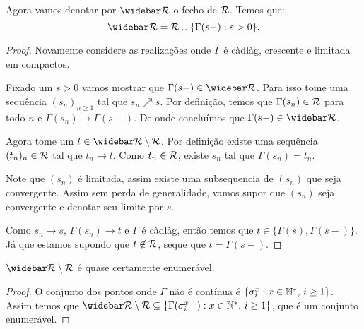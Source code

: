 \begin{proposicao}
  Agora vamos denotar por $\RRb$ o fecho de ${\mathcal{R}}$. Temos que:
  \begin{displaymath}
    \RRb = \RR \cup \{ \Gamma(s-) : s > 0 \}.
  \end{displaymath}
\end{proposicao}
\begin{proof}
  Novamente considere as realizações onde $\Gamma$ é càdlàg, crescente
  e limitada em compactos.

  Fixado um $s > 0$ vamos mostrar que $\Gamma(s-) \in \RRb$. Para isso
  tome uma sequência $(s_n)_{n \geq 1}$ tal que $s_n \nearrow s$. Por
  definição, temos que $\Gamma(s_n) \in {\mathcal{R}}$ para todo $n$ e
  $\Gamma(s_n) \to \Gamma(s-)$. De onde concluímos que $\Gamma(s-) \in
  \RRb$.

  Agora tome um $t \in \RRb \setminus \RR$. Por definição existe uma
  sequência $(t_n)_n \in {\mathcal{R}}$ tal que $t_n \to t$. Como $t_n \in {\mathcal{R}}$,
  existe $s_n$ tal que $\Gamma(s_n) = t_n$.

  Note que $(s_n)$ é limitada, assim existe uma subsequencia de $(s_n)$
  que seja convergente. Assim sem perda de generalidade, vamos supor
  que $(s_n)$ seja convergente e denotar seu limite por $s$.

  Como $s_n \to s$, $\Gamma(s_n) \to t$ e $\Gamma$ é càdlàg, então
  temos que $t \in \{ \Gamma(s), \Gamma(s-) \}$. Já que estamos
  supondo que $t \not\in {\mathcal{R}}$, seque que $t = \Gamma(s-)$.
\end{proof}

\begin{proposicao}
  $\RRb \setminus \RR$ é quase certamente enumerável.
\end{proposicao}
\begin{proof}
  O conjunto dos pontos onde $\Gamma$ não é contínua é $\{ \sigma_i^x:
  x \in {\mathbb{N^*}}, \, i \geq 1\}$. Assim temos que $\RRb \setminus \RR
  \subseteq \{ \Gamma(\sigma_i^x-): x \in \Nz, \, i \geq 1\}$, que é
  um conjunto enumerável.
\end{proof}

